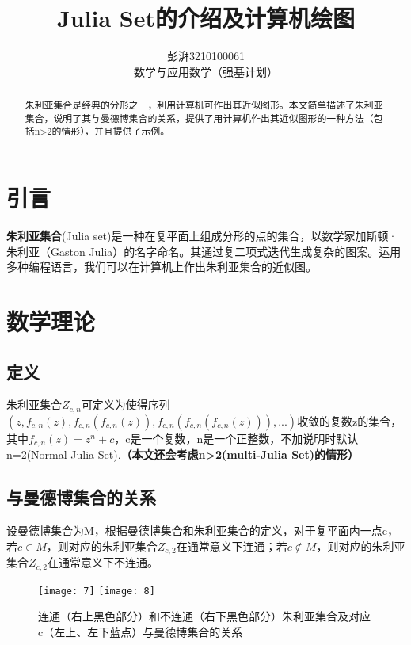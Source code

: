 \documentclass{ctexart}
\title{Julia Set的介绍及计算机绘图}
\author{彭湃3210100061 \\ 数学与应用数学（强基计划）}
\begin{document}
\maketitle

\begin{abstract}

朱利亚集合是经典的分形之一，利用计算机可作出其近似图形。本文简单描述了朱利亚集合，说明了其与曼德博集合的关系，提供了用计算机作出其近似图形的一种方法（包括n>2的情形），并且提供了示例。

\end{abstract}

\section{引言}

\textbf{朱利亚集合}(Julia set)是一种在复平面上组成分形的点的集合，以数学家加斯顿·朱利亚（Gaston Julia）的名字命名。其通过复二项式迭代生成复杂的图案。运用多种编程语言，我们可以在计算机上作出朱利亚集合的近似图。\cite{JuliaSet}

\section{数学理论}

\subsection{定义}
朱利亚集合$Z_{c,n}$可定义为使得序列$(z, f_{c,n}(z),f_{c,n}(f_{c,n}(z)),f_{c,n}(f_{c,n}(f_{c,n}(z))), ...)$收敛的复数z的集合，其中$f_{c,n}(z)=z^n+c$，c是一个复数，n是一个正整数，不加说明时默认n=2(Normal Julia Set).\textbf{（本文还会考虑n>2(multi-Julia Set)的情形）}\cite{JuliaSet}

\subsection{与曼德博集合的关系}
设曼德博集合为M，根据曼德博集合和朱利亚集合的定义，对于复平面内一点c，若$c\in M$，则对应的朱利亚集合$Z_{c,2}$在通常意义下连通；若$c\notin M$，则对应的朱利亚集合$Z_{c,2}$在通常意义下不连通。\cite{TheJuliaSet}

\begin{figure}
\texttt{[image: 7]}
\texttt{[image: 8]}
\caption{连通（右上黑色部分）和不连通（右下黑色部分）朱利亚集合及对应c（左上、左下蓝点）与曼德博集合的关系\cite{TheJuliaSet}}
\end{figure}
\end{document}
